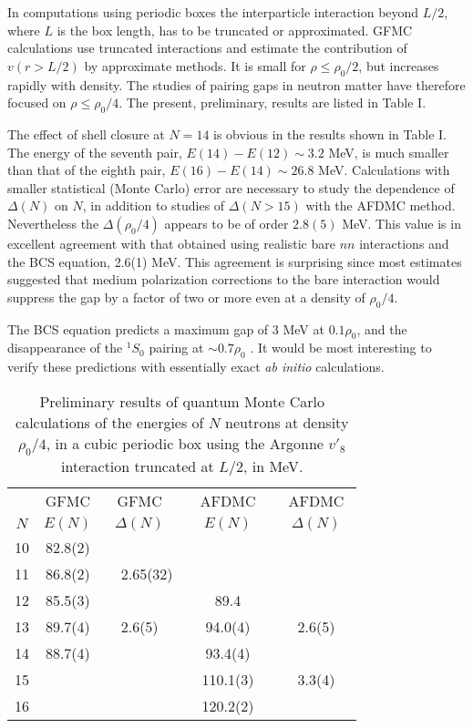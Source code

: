 In computations using periodic boxes the interparticle interaction beyond
$L/2$, where $L$ is the box length, has to be truncated or approximated.  
GFMC calculations \cite{nmgfmc} use truncated interactions and estimate the 
contribution of $v(r > L/2)$ by approximate methods.  It is small for $\rho \leq 
\rho_0/2$, but increases rapidly with density.  The studies of pairing gaps 
in neutron matter have therefore focused on $\rho \leq \rho_0/4$.  The present,  
preliminary, results are listed in Table I. 

The effect of shell closure at $N=14$ is obvious in the results shown in 
Table I.  The energy of the seventh pair, $E(14)-E(12) \sim 3.2$ MeV, is much 
smaller than that of the eighth pair, $E(16)-E(14) \sim 26.8$ MeV.  Calculations 
with smaller statistical (Monte Carlo) error are necessary to study the dependence 
of $\Delta(N)$ on $N$, in addition to studies of $\Delta(N > 15)$ with the AFDMC 
method.  Nevertheless the $\Delta(\rho_0/4)$ appears to be 
of order $2.8(5)$ MeV.  This value is in excellent agreement with that obtained 
using realistic bare $nn$ interactions and the BCS equation, 2.6(1) MeV. 
This agreement is surprising since most estimates \cite{rmp1} suggested that 
medium polarization corrections to the bare interaction would suppress the 
gap by a factor of two or more even at a density of $\rho_0/4$. 

The BCS equation predicts a maximum gap of 3 MeV at $0.1\rho_0$, and the 
disappearance of the $^1S_0$ pairing at $\sim 0.7\rho_0$ \cite{rmp1}.  
It would be most 
interesting to verify these predictions with essentially exact {\em ab initio} 
calculations. 

\begin{table}
\caption{Preliminary results of quantum Monte Carlo calculations of the 
energies of $N$ neutrons at density $\rho_0/4$, in a cubic periodic box 
using the Argonne $v'_8$ interaction truncated at $L/2$, in MeV.}  
\vspace{0.2cm}
\begin{tabular}{ccccc}
   & GFMC &  GFMC &  AFDMC & AFDMC \\
$N$ & $E(N)$ & $\Delta(N)$ & $E(N)$ & $\Delta(N)$ \\ 
\hline
10  & 82.8(2) &    &  &   \\
11  & 86.8(2) &~~2.65(32) &  & \\
12  & 85.5(3) &    & 89.4  & \\
13  & 89.7(4) & 2.6(5)  &  94.0(4) & 2.6(5) \\
14  & 88.7(4) &   &  93.4(4)  &   \\
15  &     &     &~~110.1(3)~~&~~3.3(4)~~\\
16  &     &     &  120.2(2)  &   \\
\hline
\end{tabular}
\end{table}

